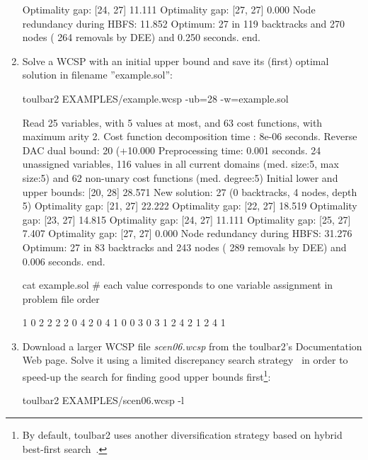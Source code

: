 \begin{enumerate}
{\begin{DoxyCode}
Optimality gap: [24, 27] 11.111 %
Optimality gap: [27, 27] 0.000 %
Node redundancy during HBFS: 11.852 %
Optimum: 27 in 119 backtracks and 270 nodes ( 264 removals by DEE) and 0.250 seconds.
end.
\end{DoxyCode}}
\item Solve a WCSP with an initial upper bound and save its (first) optimal solution
in filename ''example.sol'':
\begin{DoxyCode}
	toulbar2 EXAMPLES/example.wcsp -ub=28 -w=example.sol
\end{DoxyCode}
{\scriptsize
\begin{DoxyCode}
Read 25 variables, with 5 values at most, and 63 cost functions, with maximum arity 2.
Cost function decomposition time : 8e-06 seconds.
Reverse DAC dual bound: 20 (+10.000%
Preprocessing time: 0.001 seconds.
24 unassigned variables, 116 values in all current domains (med. size:5, max size:5) and 62 non-unary cost functions (med. degree:5)
Initial lower and upper bounds: [20, 28] 28.571%
New solution: 27 (0 backtracks, 4 nodes, depth 5)
Optimality gap: [21, 27] 22.222 %
Optimality gap: [22, 27] 18.519 %
Optimality gap: [23, 27] 14.815 %
Optimality gap: [24, 27] 11.111 %
Optimality gap: [25, 27] 7.407 %
Optimality gap: [27, 27] 0.000 %
Node redundancy during HBFS: 31.276 %
Optimum: 27 in 83 backtracks and 243 nodes ( 289 removals by DEE) and 0.006 seconds.
end.
\end{DoxyCode}}
\begin{DoxyCode}
cat example.sol
# each value corresponds to one variable assignment in problem file order
\end{DoxyCode}
{\scriptsize
\begin{DoxyCode}
1 0 2 2 2 2 0 4 2 0 4 1 0 0 3 0 3 1 2 4 2 1 2 4 1
\end{DoxyCode}}
\item Download a larger WCSP file {\em scen06.wcsp} from the toulbar2's Documentation Web page. Solve it using a limited discrepancy search strategy~\cite{Ginsberg95} in order to speed-up the search for finding good upper bounds first\footnote{By default, toulbar2 uses another diversification strategy based on hybrid best-first search~\cite{Katsirelos15a}.}:
\begin{DoxyCode}
	toulbar2 EXAMPLES/scen06.wcsp -l
\end{DoxyCode}

\end{enumerate}
